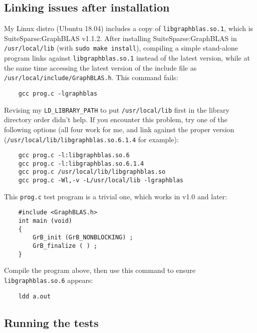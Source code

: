 \documentclass[12pt]{article}
\begin{document}
{%
\subsection{Linking issues after installation}

My Linux distro (Ubuntu 18.04) includes a copy of \verb'libgraphblas.so.1',
which is SuiteSparse:GraphBLAS v1.1.2.  After installing SuiteSparse:GraphBLAS
in \verb'/usr/local/lib' (with \verb'sudo make install'), compiling a simple
stand-alone program links against \verb'libgraphblas.so.1' instead of the
latest version, while at the same time accessing the latest version of the
include file as \verb'/usr/local/include/GraphBLAS.h'.  This command fails:

    {\small
    \begin{verbatim}
    gcc prog.c -lgraphblas \end{verbatim} }

Revising my \verb'LD_LIBRARY_PATH' to put \verb'/usr/local/lib' first in the
library directory order didn't help.  If you encounter this problem, try one of
the following options (all four work for me, and link against the proper
version (\verb'/usr/local/lib/libgraphblas.so.6.1.4' for example):

    {\small
    \begin{verbatim}
    gcc prog.c -l:libgraphblas.so.6
    gcc prog.c -l:libgraphblas.so.6.1.4
    gcc prog.c /usr/local/lib/libgraphblas.so
    gcc prog.c -Wl,-v -L/usr/local/lib -lgraphblas \end{verbatim} }

This \verb'prog.c' test program is a trivial one, which works in v1.0 and
later:

    {\small
    \begin{verbatim}
    #include <GraphBLAS.h>
    int main (void)
    {
        GrB_init (GrB_NONBLOCKING) ;
        GrB_finalize ( ) ;
    } \end{verbatim} }

Compile the program above, then use this command to ensure
\verb'libgraphblas.so.6' appears:

    {\small
    \begin{verbatim}
    ldd a.out \end{verbatim} }

\subsection{Running the tests}

}
\end{document}
